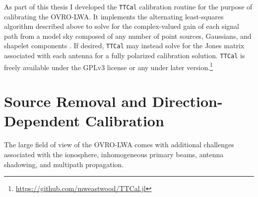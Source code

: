 \begin{bibunit}
As part of this thesis I developed the \texttt{TTCal} calibration routine for the purpose of
calibrating the OVRO-LWA. It implements the alternating least-squares algorithm described above to
solve for the complex-valued gain of each signal path from a model sky composed of any number of
point sources, Gaussians, and shapelet components \citep{2003MNRAS.338...35R}. If desired,
\texttt{TTCal} may instead solve for the Jones matrix associated with each antenna for a fully
polarized calibration solution. \texttt{TTCal} is freely available under the GPLv3 license or any
under later version.\footnote{
    \url{https://github.com/mweastwood/TTCal.jl}
}


\section{Source Removal and Direction-Dependent Calibration}

The large field of view of the OVRO-LWA comes with additional challenges associated with the
ionosphere, inhomogeneous primary beams, antenna shadowing, and multipath propagation.


\end{bibunit}
